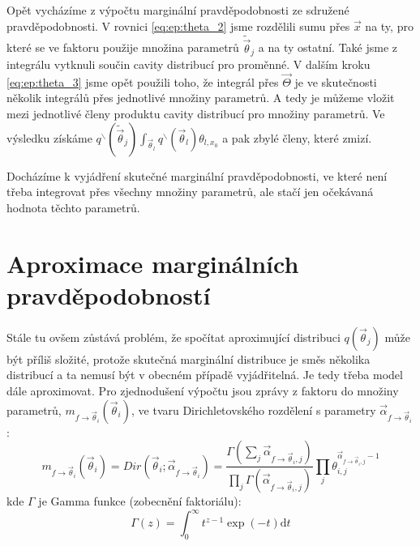 Opět vycházíme z výpočtu marginální pravděpodobnosti ze sdružené
pravděpodobnosti. V rovnici \eqref{eq:ep:theta_2} jsme rozdělili sumu přes
$\vec{x}$ na ty, pro které se ve faktoru použije množina parametrů
$\tilde{\vec{\theta}}_j$ a na ty ostatní. Také jsme z integrálu vytknuli součin
cavity distribucí pro proměnné. V dalším kroku \eqref{eq:ep:theta_3} jsme opět
použili toho, že integrál přes $\vec{\Theta}$ je ve skutečnosti několik
integrálů přes jednotlivé množiny parametrů. A tedy je můžeme vložit mezi
jednotlivé členy produktu cavity distribucí pro množiny parametrů. Ve výsledku
získáme $q^\backslash(\tilde{\vec{\theta}}_j) \int_{\vec{\theta}_l}
q^\backslash(\vec{\theta}_l) \theta_{l, x_0}$ a pak zbylé členy, které zmizí.

Docházíme k vyjádření skutečné marginální pravděpodobnosti, ve které není třeba
integrovat přes všechny množiny parametrů, ale stačí jen očekávaná hodnota
těchto parametrů.

\section{Aproximace marginálních pravděpodobností}

Stále tu ovšem zůstává problém, že spočítat aproximující distribuci
$q(\vec{\theta}_j)$ může být příliš složité, protože skutečná marginální
distribuce je směs několika distribucí a ta nemusí být v obecném případě
vyjádřitelná. Je tedy třeba model dále aproximovat. Pro zjednodušení výpočtu
jsou zprávy z faktoru do množiny parametrů, $m_{f \rightarrow
\vec{\theta}_i}(\vec{\theta}_i)$, ve tvaru Dirichletovského rozdělení s
parametry $\vec\alpha_{f \rightarrow \vec\theta_i}$:
\begin{equation}
m_{f \rightarrow \vec{\theta}_i}(\vec{\theta}_i) =
	Dir(\vec{\theta}_i; \vec\alpha_{f \rightarrow \vec\theta_i}) =
        \frac{\Gamma (\sum_j \vec\alpha_{f \rightarrow \vec\theta_i, j})}
             {\prod_j \Gamma(\vec\alpha_{f \rightarrow \vec\theta_i, j})}
        \prod_j \theta_{i,j}^{\vec\alpha_{f \rightarrow \vec\theta_i, j} - 1}
\end{equation}
kde $\Gamma$ je Gamma funkce (zobecnění faktoriálu):
\begin{equation}
    \Gamma(z) = \int_0^\infty \! t^{z-1} \exp(-t) \mathrm{d}t
\end{equation}

